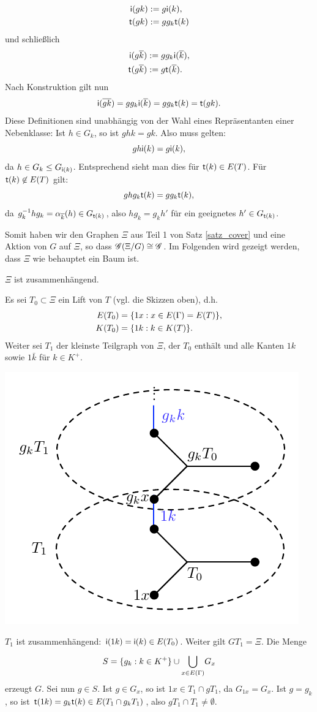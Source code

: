 \documentclass[a4paper, 12pt, twoside]{article}
\begin{document}
\begin{align*}
\mathsf{i}(gk) &:= g \mathsf{i}(k), \\
\mathsf{t}(gk) &:= g g_k \mathsf{t}(k)
\end{align*}
und schließlich
\begin{align*}
\mathsf{i}(g\overline{k}) &:= g g_k \mathsf{i}(\overline{k}), \\
\mathsf{t}(g \overline{k}) &:= g \mathsf{t}(\overline{k}).
\end{align*}
Nach Konstruktion gilt nun
\[
\mathsf{i}(\overline{gk}) = g g_k \mathsf{i}(\overline{k}) = g g_k \mathsf{t}(k)
= \mathsf{t}(gk).
\]
Diese Definitionen sind unabhängig von der Wahl eines Repräsentanten
einer Nebenklasse: Ist $h\in G_k$, so ist $g h k = g k$.
Also muss gelten:
\[
g h \mathsf{i}(k) = g \mathsf{i}(k),
\]
da $h\in G_k \leq G_{\mathsf{i}(k)}$. Entsprechend sieht man dies
für $\mathsf{t}(k)\in E(T)$.
Für $\mathsf{t}(k)\not\in E(T)$ gilt:
\[
g h g_k \mathsf{t}(k) = g g_k \mathsf{t}(k),
\]
da $ g_k^{-1} h g_k = \alpha_{\overline{k}}(h) \in G_{\mathsf{t}(k)}$,
also $h g_k = g_k h'$ für ein geeignetes $h'\in G_{\mathsf{t}(k)}$.

Somit haben wir den Graphen $\Xi$ aus Teil 1 von Satz \ref{satz_cover}
und eine Aktion von $G$ auf $\Xi$, so dass $\mathscr{G}(\Xi/G)\cong \mathscr{G}$.
Im Folgenden wird gezeigt werden, dass $\Xi$ wie behauptet ein Baum
ist.

\BEM $\Xi$ ist zusammenhängend.

\bew Es sei $T_0 \subset \Xi$ ein Lift von $T$ (vgl. die Skizzen 
oben), d.h.
\begin{align*}
E(T_0) &= \{ 1x : x\in E(\Gamma)=E(T) \}, \\
K(T_0) &= \{ 1k : k\in K(T) \}.
\end{align*}
Weiter sei $T_1$ der kleinste Teilgraph von $\Xi$, der $T_0$ enthält
und alle Kanten $1k$ sowie $1\bar{k}$ für $k\in K^+$.
\begin{center}
	\includegraphics{grugraImages/T0T1}
\end{center}
$T_1$ ist zusammenhängend: $\mathsf{i}(1k)=\mathsf{i}(k)\in E(T_0)$.
Weiter gilt  $GT_1 = \Xi$. Die Menge
\[
S = \{g_k : k\in K^+ \} \cup \overset{}{\underset{x\in E(\Gamma)}{\mathop{\bigcup}}} G_x
\]
erzeugt $G$. Sei nun $g\in S$. Ist $g \in G_x$, so ist
$1x \in T_1 \cap g T_1$, da $G_{1x}=G_x$.
Ist $g=g_k$, so ist $\mathsf{t}(1k)=g_k \mathsf{t}(k) \in E(T_1 \cap g_k T_1)$,
also $g T_1 \cap T_1 \neq \emptyset$.
\end{document}
